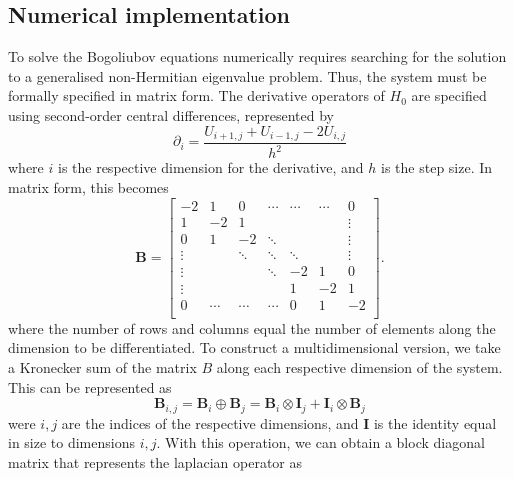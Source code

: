 \subsection{Numerical implementation}
To solve the Bogoliubov equations numerically requires searching for the solution to a generalised non-Hermitian eigenvalue problem. Thus, the system must be formally specified in matrix form. The derivative operators of $H_0$ are specified using second-order central differences, represented by
\begin{equation}
    \partial_i = \frac{U_{i+1,j} + U_{i-1,j} - 2U_{i,j}}{h^2}
\end{equation}
where $i$ is the respective dimension for the derivative, and $h$ is the step size. In matrix form, this becomes
\begin{equation}
    \mathbf{B} =
    \begin{bmatrix}
            -2      &   1    &    0   &  \cdots   &  \cdots   &  \cdots   & 0 \\
            1       &   -2   &    1   &           &           &     &  \vdots \\
            0       &    1   &   -2   & \ddots    &           &     &  \vdots \\
            \vdots  &        & \ddots & \ddots    & {\ddots}  &     &  \vdots \\
            \vdots  &        &        & \ddots    &    -2     &  1  &       0 \\
            \vdots  &        &        &           &     1     & -2  &       1 \\
            0       & \cdots & \cdots & \cdots    &     0     &  1  &      -2 \\
        \end{bmatrix}.
\end{equation}
where the number of rows and columns equal the number of elements along the dimension to be differentiated. To construct a multidimensional version, we take a Kronecker sum of the matrix $B$ along each respective dimension of the system. This can be represented as
\begin{equation}
    \mathbf{B}_{i,j} = \mathbf{B}_i \oplus \mathbf{B}_j = \mathbf{B}_i \otimes \mathbf{I}_j + \mathbf{I}_i \otimes \mathbf{B}_j
\end{equation}
were $i,j$ are the indices of the respective dimensions, and $\mathbf{I}$ is the identity equal in size to dimensions $i,j$. With this operation, we can obtain a block diagonal matrix that represents the laplacian operator as

